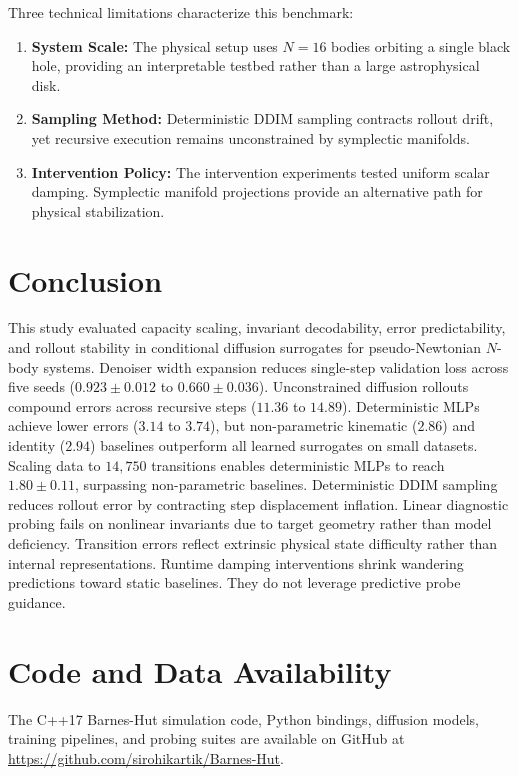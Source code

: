 \documentclass[11pt,a4paper]{article}
\begin{document}
Three technical limitations characterize this benchmark:
\begin{enumerate}
    \item \textbf{System Scale:} The physical setup uses $N=16$ bodies orbiting a single black hole, providing an interpretable testbed rather than a large astrophysical disk.
    \item \textbf{Sampling Method:} Deterministic DDIM sampling contracts rollout drift, yet recursive execution remains unconstrained by symplectic manifolds.
    \item \textbf{Intervention Policy:} The intervention experiments tested uniform scalar damping. Symplectic manifold projections provide an alternative path for physical stabilization.
\end{enumerate}

\section{Conclusion}
This study evaluated capacity scaling, invariant decodability, error predictability, and rollout stability in conditional diffusion surrogates for pseudo-Newtonian $N$-body systems. Denoiser width expansion reduces single-step validation loss across five seeds ($0.923 \pm 0.012$ to $0.660 \pm 0.036$). Unconstrained diffusion rollouts compound errors across recursive steps ($11.36$ to $14.89$). Deterministic MLPs achieve lower errors ($3.14$ to $3.74$), but non-parametric kinematic ($2.86$) and identity ($2.94$) baselines outperform all learned surrogates on small datasets. Scaling data to $14,750$ transitions enables deterministic MLPs to reach $1.80 \pm 0.11$, surpassing non-parametric baselines. Deterministic DDIM sampling reduces rollout error by contracting step displacement inflation. Linear diagnostic probing fails on nonlinear invariants due to target geometry rather than model deficiency. Transition errors reflect extrinsic physical state difficulty rather than internal representations. Runtime damping interventions shrink wandering predictions toward static baselines. They do not leverage predictive probe guidance.

\section*{Code and Data Availability}
The C++17 Barnes-Hut simulation code, Python bindings, diffusion models, training pipelines, and probing suites are available on GitHub at \url{https://github.com/sirohikartik/Barnes-Hut}.
\end{document}
